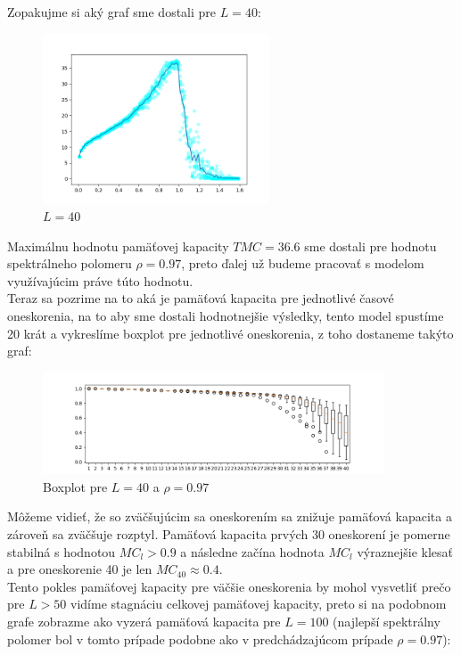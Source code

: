 \documentclass[a4paper]{article}
\begin{document}
	Zopakujme si aký graf sme dostali pre $L=40$:
	
	\begin{figure}[!h]
		\centering
		\includegraphics[width=0.6\textwidth]{../L_40.png}
		\caption{$L=40$}
	\end{figure}

	Maximálnu hodnotu pamäťovej kapacity $TMC=36.6$ sme dostali pre hodnotu spektrálneho polomeru $\rho=0.97$, preto ďalej už budeme pracovať s modelom využívajúcim práve túto hodnotu. 
	\\
	
	Teraz sa pozrime na to aká je pamäťová kapacita pre jednotlivé časové oneskorenia, na to aby sme dostali hodnotnejšie výsledky, tento model spustíme 20 krát a vykreslíme boxplot pre jednotlivé oneskorenia, z toho dostaneme takýto graf:
	
	\begin{figure}[!h]
		\centering
		\includegraphics[width=0.9\textwidth]{../box_L_40.png}
		\caption{Boxplot pre $L=40$ a $\rho=0.97$}
	\end{figure}
	
	Môžeme vidieť, že so zväčšujúcim sa oneskorením sa znižuje pamäťová kapacita a zároveň sa zväčšuje rozptyl. Pamäťová kapacita prvých 30 oneskorení je pomerne stabilná s hodnotou $MC_l>0.9$ a následne začína hodnota $MC_l$ výraznejšie klesať a pre oneskorenie 40 je len $MC_{40}\approx 0.4$.
	\\
	
	Tento pokles pamäťovej kapacity pre väčšie oneskorenia by mohol vysvetliť prečo pre $L>50$ vidíme stagnáciu celkovej pamäťovej kapacity, preto si na podobnom grafe zobrazme ako vyzerá pamäťová kapacita pre $L=100$ (najlepší spektrálny polomer bol v tomto prípade podobne ako v predchádzajúcom prípade $\rho=0.97$):
	
\end{document}
